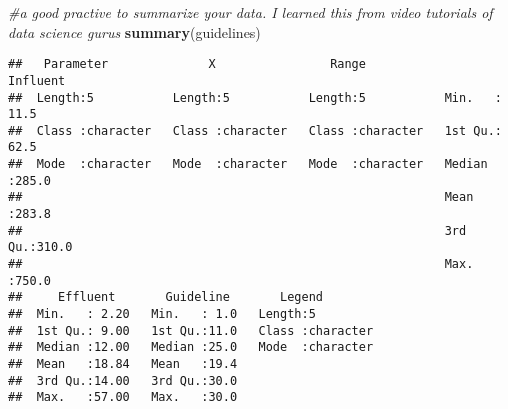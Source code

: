 \documentclass[
]{article}
\newenvironment{Shaded}{\begin{snugshade}}{\end{snugshade}}
\newcommand{\CommentTok}[1]{\textcolor[rgb]{0.56,0.35,0.01}{\textit{#1}}}
\newcommand{\KeywordTok}[1]{\textcolor[rgb]{0.13,0.29,0.53}{\textbf{#1}}}
\newcommand{\NormalTok}[1]{#1}
\begin{document}
\begin{Shaded}
\begin{Highlighting}[]
\CommentTok{#a good practive to summarize your data. I learned this from video tutorials of data science gurus}
\KeywordTok{summary}\NormalTok{(guidelines)}
\end{Highlighting}
\end{Shaded}

\begin{verbatim}
##   Parameter              X                Range              Influent    
##  Length:5           Length:5           Length:5           Min.   : 11.5  
##  Class :character   Class :character   Class :character   1st Qu.: 62.5  
##  Mode  :character   Mode  :character   Mode  :character   Median :285.0  
##                                                           Mean   :283.8  
##                                                           3rd Qu.:310.0  
##                                                           Max.   :750.0  
##     Effluent       Guideline       Legend         
##  Min.   : 2.20   Min.   : 1.0   Length:5          
##  1st Qu.: 9.00   1st Qu.:11.0   Class :character  
##  Median :12.00   Median :25.0   Mode  :character  
##  Mean   :18.84   Mean   :19.4                     
##  3rd Qu.:14.00   3rd Qu.:30.0                     
##  Max.   :57.00   Max.   :30.0
\end{verbatim}
\end{document}
